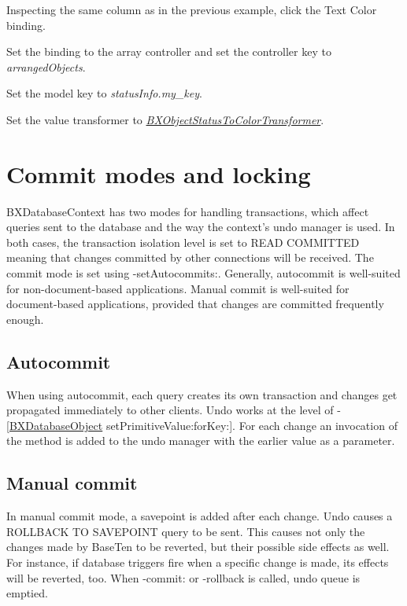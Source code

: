 \begin{DoxyEnumerate}
\item Inspecting the same column as in the previous example, click the Text Color binding. 
\item Set the binding to the array controller and set the controller key to {\itshape arranged\+Objects}. 
\item Set the model key to {\itshape status\+Info.\+my\+\_\+key}. 
\item Set the value transformer to {\itshape \hyperlink{interface_b_x_object_status_to_color_transformer}{B\+X\+Object\+Status\+To\+Color\+Transformer}}. 
\end{DoxyEnumerate}\hypertarget{autocommit_manual_commit}{}\section{Commit modes and locking}\label{autocommit_manual_commit}
B\+X\+Database\+Context has two modes for handling transactions, which affect queries sent to the database and the way the context's undo manager is used. In both cases, the transaction isolation level is set to R\+E\+A\+D C\+O\+M\+M\+I\+T\+T\+E\+D meaning that changes committed by other connections will be received. The commit mode is set using -\/set\+Autocommits\+:. Generally, autocommit is well-\/suited for non-\/document-\/based applications. Manual commit is well-\/suited for document-\/based applications, provided that changes are committed frequently enough.\hypertarget{autocommit_manual_commit_autocommit}{}\subsection{Autocommit}\label{autocommit_manual_commit_autocommit}
When using autocommit, each query creates its own transaction and changes get propagated immediately to other clients. Undo works at the level of -\/\mbox{[}\hyperlink{interface_b_x_database_object}{B\+X\+Database\+Object} set\+Primitive\+Value\+:for\+Key\+:\mbox{]}. For each change an invocation of the method is added to the undo manager with the earlier value as a parameter.\hypertarget{autocommit_manual_commit_manual_commit}{}\subsection{Manual commit}\label{autocommit_manual_commit_manual_commit}
In manual commit mode, a savepoint is added after each change. Undo causes a R\+O\+L\+L\+B\+A\+C\+K T\+O S\+A\+V\+E\+P\+O\+I\+N\+T query to be sent. This causes not only the changes made by Base\+Ten to be reverted, but their possible side effects as well. For instance, if database triggers fire when a specific change is made, its effects will be reverted, too. When -\/commit\+: or -\/rollback is called, undo queue is emptied.

